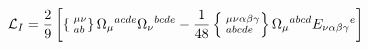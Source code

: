 \begin{equation}
{\cal L}_I = \frac{2}{9} \left[ \left\{ \phantom{|}^{\mu\nu}_{ab}
\right\} \Omega_\mu{}^{acde} \Omega_\nu{}^{bcde} - \frac{1}{48}
\left\{ \phantom{|}^{\mu\nu\alpha\beta\gamma}_{abcde} \right\}
\Omega_\mu{}^{abcd} E_{\nu\alpha\beta\gamma}{}^e \right]
\end{equation}

